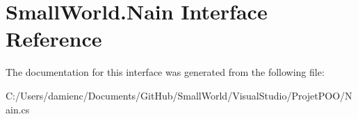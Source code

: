 \hypertarget{interface_small_world_1_1_nain}{\section{Small\-World.\-Nain Interface Reference}
\label{interface_small_world_1_1_nain}
}


The documentation for this interface was generated from the following file\-:\begin{DoxyCompactItemize}
\item 
C\-:/\-Users/damienc/\-Documents/\-Git\-Hub/\-Small\-World/\-Visual\-Studio/\-Projet\-P\-O\-O/Nain.\-cs\end{DoxyCompactItemize}

